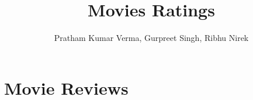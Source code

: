 \documentclass{article}
\title{Movies Ratings}
\author{Pratham Kumar Verma, Gurpreet Singh, Ribhu Nirek}
\date{}
\begin{document}
\maketitle

\section*{Movie Reviews}
\end{document}
